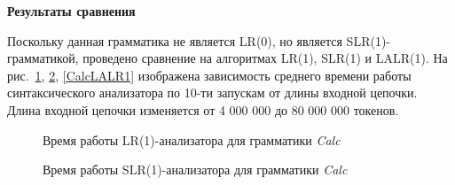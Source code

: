 \documentclass[14pt]{matmex-diploma}
\begin{document}
{\large \textbf{Результаты сравнения}}

Поскольку данная грамматика не является LR(0), но является SLR(1)-грамматикой, проведено сравнение на алгоритмах LR(1), SLR(1) и LALR(1).
На рис.~\ref{CalcLR1}, \ref{CalcSLR1}, \ref{CalcLALR1} изображена зависимость среднего времени работы синтаксического анализатора по 10-ти запускам от длины входной цепочки. Длина входной цепочки изменяется от 4 000 000 до 80 000 000 токенов.

\begin{figure}[h]
  \caption{Время работы LR(1)-анализатора для грамматики \textit{Calc}}
  \label{CalcLR1}
  \centering
\end{figure}

\begin{figure}[H]
  \caption{Время работы SLR(1)-анализатора для грамматики \textit{Calc}}
  \label{CalcSLR1}
  \centering
\end{figure}
\end{document}
